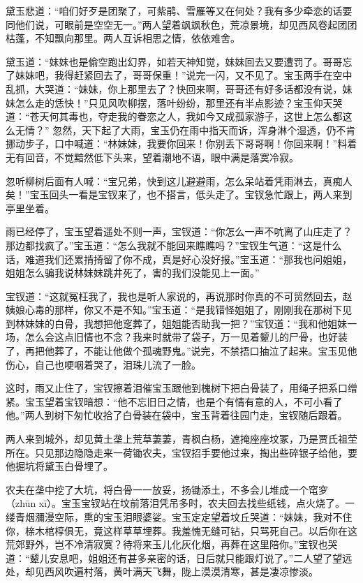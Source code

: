 \documentclass[12pt,oneside]{book}
\begin{document}
黛玉悲道：“咱们好歹是团聚了，可紫鹃、雪雁等又在何处？我有多少牵恋的话要同他们说，可眼前是空空无一。”两人望着飒飒秋色，荒凉景境，却见西风卷起团团枯蓬，不知飘向那里。两人互诉相思之情，依依难舍。

黛玉道：“妹妹也是偷空跑出幻界，如若天神知觉，妹妹回去又要遭罚了。哥哥忘了妹妹吧，我得赶紧回去了，哥哥保重！”说完一闪，又不见了。宝玉两手在空中乱抓，大哭道：“妹妹，你上那里去了？快回来啊，哥哥还有好多话都没有说，妹妹怎么走的恁快！”只见风吹柳摆，落叶纷纷，那里还有半点影迹？宝玉仰天哭道：“苍天何其毒也，夺走我的眷恋之人，我如今又成孤家游子，这世上怎么都这么无情？”
忽然，天下起了大雨，宝玉仍在雨中指天而诉，浑身淋个湿透，仍不肯挪动步子，口中喊道：“林妹妹，我要你回来！你别丢下哥哥啊！你回来啊！”料着无有回音，不觉黯然低下头来，望着潮地不语，眼中满是落寞冷寂。

忽听柳树后面有人喊：“宝兄弟，快到这儿避避雨，怎么呆站着凭雨淋去，真痴人矣！”宝玉回头一看是宝钗来了，也不搭言，低头走了。宝钗急忙跟上，两人来到亭里坐着。

雨已经停了，宝玉望着遥处不则一声，宝钗道：“你怎么一声不吭离了山庄走了？那边都找疯了。”宝玉道：“怎么我就不能回来瞧瞧吗？”宝钗生气道：“这是什么话，难道我们还累掯掎留了你不成，真是好心没好报。”宝玉道：“那我也问姐姐，姐姐怎么骗我说林妹妹跳井死了，害的我们没能见上一面。”

宝钗道：“这就冤枉我了，我也是听人家说的，再说那时你真的不可贸然回去，赵姨娘心毒的那样，你又不是不知。”宝玉道：“是我错怪姐姐了，刚刚我在那树下见到林妹妹的白骨，我想把他窆葬了，姐姐能否助我一把？”宝钗道：“我和他姐妹一场，怎么会这点旧情也不念？我来时就带了袋子，万一见着颦儿的尸骨，也好装了，再把他葬了，不能让他做个孤魂野鬼。”说完，不禁捂口抽泣了起来。宝玉见他伤心，自己也哽咽着哭了，泪珠儿流了一脸。

这时，雨又止住了，宝钗擦着泪催宝玉跟他到槐树下把白骨装了，用绳子把系口缯紧。宝玉望着宝钗暗想：“他不忘旧日之情，也是个有情有意的人，不可小看了他。”两人到树下匆忙收拾了白骨装在袋中，宝玉背着往园门走，宝钗随后跟着。

两人来到城外，却见黄土垄上荒草萋萋，青枫白杨，遮掩座座坟冢，乃是贾氏祖茔所在。只见那边隐隐走来一荷锄农夫，宝钗招手要他过来，掏出些碎银子给他，要他掘坑将黛玉白骨埋了。

农夫在垄中挖了大坑，将白骨一一放妥，扬锄添土，不多会儿堆成一个窀穸（zhūn xī）。宝玉宝钗站在坟前落泪凭吊多时，农夫回去找些纸钱，点火烧了。一缕青烟瀰漫空际，熏的宝玉泪眼婆娑。宝玉定定望着坟丘哭道：“妹妹，我对不住你，榇木棺椁俱无，竟这样草草埋葬。我羞愧无缝可钻，只骂死自己。以后你在这荒郊野外，岂不冷清寂寞？待将来玉儿化灰化烟，再葬在这里陪你。”宝钗也哭道：“颦儿安息吧，姐姐还有甚多亲密的话，日后就只能跟灯说了。”二人望了望远处，却见西风吹遍村落，黄叶满天飞舞，陇上漠漠清寒，甚是凄凉惨淡。
\end{document}
